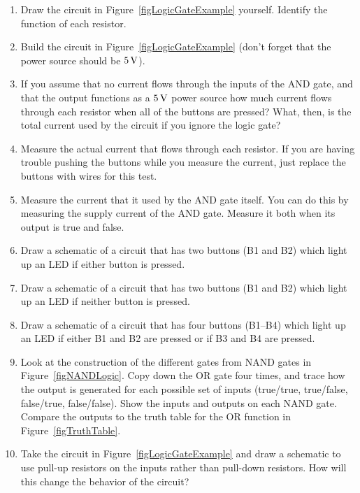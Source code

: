 \applysection

\begin{enumerate}
\item Draw the circuit in Figure~\ref{figLogicGateExample} yourself.  Identify the function of each resistor.
\item Build the circuit in Figure~\ref{figLogicGateExample} (don't forget that the power source should be $5\,\si{\volt}$).
\item If you assume that no current flows through the inputs of the AND gate, and that the output functions as a $5\,\si{\volt}$ power source how much current flows through each resistor when all of the buttons are pressed?  What, then, is the total current used by the circuit if you ignore the logic gate?
\item Measure the actual current that flows through each resistor.  If you are having trouble pushing the buttons while you measure the current, just replace the buttons with wires for this test.
\item Measure the current that it used by the AND gate itself.  You can do this by measuring the supply current of the AND gate.  Measure it both when its output is true and false.
\item Draw a schematic of a circuit that has two buttons (B1 and B2) which light up an LED if either button is pressed.
\item Draw a schematic of a circuit that has two buttons (B1 and B2) which light up an LED if neither button is pressed.
\item Draw a schematic of a circuit that has four buttons (B1--B4) which light up an LED if either B1 and B2 are pressed or if B3 and B4 are pressed.
\item Look at the construction of the different gates from NAND gates in Figure~\ref{figNANDLogic}.  Copy down the OR gate four times, and trace how the output is generated for each possible set of inputs (true/true, true/false, false/true, false/false).  Show the inputs and outputs on each NAND gate.  Compare the outputs to the truth table for the OR function in Figure~\ref{figTruthTable}.
\item Take the circuit in Figure~\ref{figLogicGateExample} and draw a schematic to use pull-up resistors on the inputs rather than pull-down resistors.  How will this change the behavior of the circuit?
\end{enumerate}

